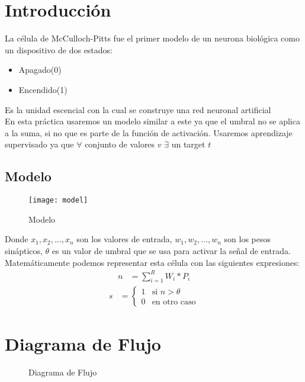 \documentclass{article}
\begin{document}
\maketitle
\tableofcontents
\section{Introducción}
La célula de McCulloch-Pitts fue el primer modelo de un neurona biológica como un dispositivo de dos estados:
\begin{itemize}
	\item Apagado(0)
	\item Encendido(1)
\end{itemize}
Es la unidad escencial con la cual se construye una red neuronal artificial\\
En esta práctica usaremos un modelo similar a este ya que el umbral no se aplica a la suma, si no que es parte de la función de activación. Usaremos aprendizaje supervisado ya que $\forall$ conjunto de valores $v$ $\exists$ un target $t$
\subsection{Modelo}
\begin{figure}[h!]
	\caption{Modelo}
	\centering
	\texttt{[image: model]}
\end{figure}
Donde $x_1, x_2,\ldots, x_n$ son los valores de entrada, $w_1, w_2,\ldots, w_n$ son los pesos sinápticos, $\theta$ es un valor de umbral que se usa para activar la señal de entrada.\\
Matemáticamente podemos representar esta célula con las siguientes expresiones:\\
\begin{align}
	n &= \sum_{i=1}^{R}W_i*P_i
\end{align}
\begin{align}
	s &{}=\displaystyle
	\begin{cases}
		1 &\text{si } n > \theta\\
		0 &\text{en otro caso}
	\end{cases}
\end{align}
\newpage
\section{Diagrama de Flujo}
\begin{figure}[htpb]
	\centering
	
	\caption{Diagrama de Flujo}
\end{figure}
\end{document}
